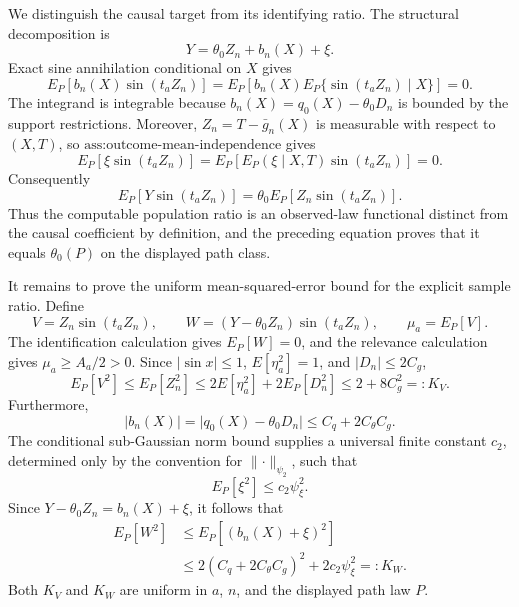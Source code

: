 We distinguish the causal target from its identifying ratio.  The structural decomposition is
\[
 Y=\theta_0Z_n+b_n(X)+\xi.
\]
Exact sine annihilation conditional on \(X\) gives
\[
 E_P[b_n(X)\sin(t_aZ_n)]
 =E_P\!\left[b_n(X)E_P\{\sin(t_aZ_n)\mid X\}\right]
 =0.
\]
The integrand is integrable because \(b_n(X)=q_0(X)-\theta_0D_n\) is bounded by the support restrictions.  Moreover, \(Z_n=T-\bar g_n(X)\) is measurable with respect to \((X,T)\), so \(\text{ass:outcome-mean-independence}\) gives
\[
 E_P[\xi\sin(t_aZ_n)]
 =E_P\!\left[E_P(\xi\mid X,T)\sin(t_aZ_n)\right]
 =0.
\]
Consequently
\[
 E_P[Y\sin(t_aZ_n)]
 =\theta_0E_P[Z_n\sin(t_aZ_n)].
\]
Thus the computable population ratio is an observed-law functional distinct from the causal coefficient by definition, and the preceding equation proves that it equals \(\theta_0(P)\) on the displayed path class.

It remains to prove the uniform mean-squared-error bound for the explicit sample ratio.  Define
\[
 V=Z_n\sin(t_aZ_n),
 \qquad
 W=(Y-\theta_0Z_n)\sin(t_aZ_n),
 \qquad
 \mu_a=E_P[V].
\]
The identification calculation gives \(E_P[W]=0\), and the relevance calculation gives \(\mu_a\geq A_a/2>0\).  Since \(\lvert\sin x\rvert\leq1\), \(E[\eta_a^2]=1\), and \(\lvert D_n\rvert\leq2C_g\),
\[
 E_P[V^2]
 \leq E_P[Z_n^2]
 \leq2E[\eta_a^2]+2E_P[D_n^2]
 \leq2+8C_g^2
 =:K_V.
\]
Furthermore,
\[
 \lvert b_n(X)\rvert
 =\lvert q_0(X)-\theta_0D_n\rvert
 \leq C_q+2C_\theta C_g.
\]
The conditional sub-Gaussian norm bound supplies a universal finite constant \(c_2\), determined only by the convention for \(\lVert\cdot\rVert_{\psi_2}\), such that
\[
 E_P[\xi^2]\leq c_2\psi_\xi^2.
\]
Since \(Y-\theta_0Z_n=b_n(X)+\xi\), it follows that
\[
\begin{aligned}
 E_P[W^2]
 &\leq E_P[(b_n(X)+\xi)^2]\\
 &\leq2(C_q+2C_\theta C_g)^2+2c_2\psi_\xi^2
 =:K_W.
\end{aligned}
\]
Both \(K_V\) and \(K_W\) are uniform in \(a\), \(n\), and the displayed path law \(P\).

